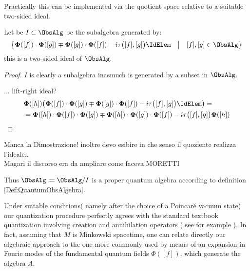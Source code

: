 \documentclass[Main]{subfiles}
\begin{document}
   		 		Practically this can be implemented via the quotient space relative to a suitable two-sided ideal.
   		 		\begin{proposition}
   		 			Let be $I \subset \ObsAlg$ be the subalgebra generated by:
   		 				\begin{displaymath}
   		 					\big\{
   		 					 \mathbf{\Phi}([f]) \cdot \mathbf{\Phi}([g])  \mp \mathbf{\Phi}([g]) \cdot \mathbf{\Phi}([f]) - 
   		 				i \tau\big( [f], [g] \big)\IdElem \quad \big \vert \quad [f],[g]\in \ObsAlg
   		 					 \big\}
   		 				\end{displaymath}
   		 			this is a two-sided ideal of $\ObsAlg$.
   		 		\end{proposition}
 \ifToninus
   		 		\begin{proof}
   		 			$I$ is clearly a subalgebra inasmuch is generated by a subset in $\ObsAlg$.
   		 			
   		 			... 	\danger lift-right ideal?
					\begin{align*}
						& \mathbf{\Phi}([h])\big(
   		 					 \mathbf{\Phi}([f]) \cdot \mathbf{\Phi}([g])  \mp \mathbf{\Phi}([g]) \cdot \mathbf{\Phi}([f]) - 
   		 				i \tau\big( [f], [g] \big)\IdElem
   		 					 \big)=\\
   		 				&= \mathbf{\Phi}([h]) \cdot \mathbf{\Phi}([f]) \cdot \mathbf{\Phi}([g]) \mp  \mathbf{\Phi}([h]) \cdot \mathbf{\Phi}([g]) \cdot \mathbf{\Phi}([f])
   		 					 - i \tau\big( [f], [g] \big) \mathbf{\Phi}([h])
   		 			\end{align*}					   		 			
   		 		\end{proof}
   		 		\begin{Warning}
   		 			Manca la Dimostrazione! inoltre devo esibire in che senso il quoziente realizza l'ideale..
   		 			\\
   		 			Magari il discorso era da ampliare come faceva MORETTI \cite{Khavkine2014a}
   		 		
   		 		\end{Warning}
 \fi
   		 		Thus $\mathbf{\ObsAlg} \coloneqq \ObsAlg / I$ is a proper quantum algebra according to definition \ref{Def:QuantumObsAlgebra}.   			
   			
			\begin{remark}
			Under suitable conditions( namely after the choice of a Poincaré vacuum state) our quantization procedure perfectly agrees with the standard textbook quantization involving creation and annihilation operators ( see for example \cite{Mandl}). 
			In fact, assuming that $M$ is Minkowski spacetime, one can relate directly our algebraic approach to the one more commonly used by means of an expansion in Fourie modes of the fundamental quantum fields $\Phi([ f ])$, which generate the algebra $A$.
			\end{remark}   			
   			
\end{document}
